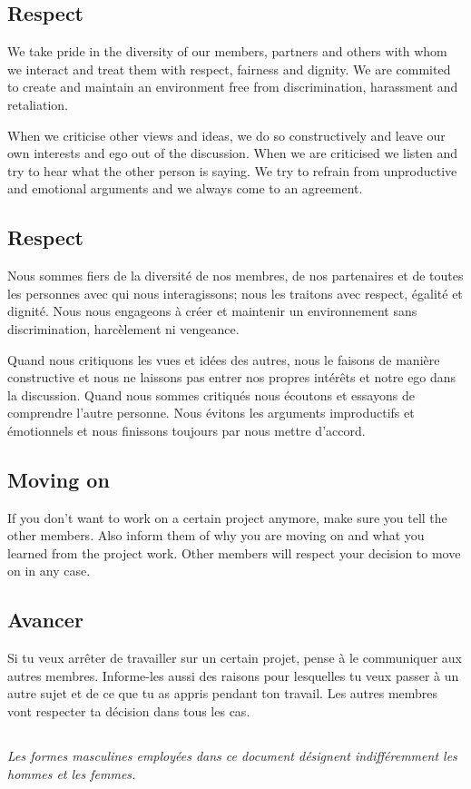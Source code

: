\english
	\subsection{Respect}
 	We take pride in the diversity of our members, partners and others with whom we interact and treat them with respect, fairness and dignity. We are commited to create and maintain an environment free from discrimination, harassment and retaliation. 

 	When we criticise other views and ideas, we do so constructively and leave our own interests and ego out of the discussion. 
 	When we are criticised we listen and try to hear what the other person is saying. 
 	We try to refrain from unproductive and emotional arguments and we always come to an agreement.
	\vspace{1cm}


\french
	\subsection{Respect}
	Nous sommes fiers de la diversité de nos membres, de nos partenaires et de toutes les personnes avec qui nous interagissons; nous les traitons avec respect, égalité et dignité. Nous nous engageons à créer et maintenir un environnement sans discrimination, harcèlement ni vengeance. 

	Quand nous critiquons les vues et idées des autres, nous le faisons de manière constructive et nous ne laissons pas entrer nos propres intérêts et notre ego dans la discussion.
	Quand nous sommes critiqués nous écoutons et essayons de comprendre l'autre personne. 
	Nous évitons les arguments improductifs et émotionnels et nous finissons toujours par nous mettre d'accord.

\english
	\subsection{Moving on}
	If you don't want to work on a certain project anymore, make sure you tell the other members. Also inform them of why you are moving on and what you learned from the project work. Other members will respect your decision to move on in any case.

\french
	\subsection{Avancer}
	Si tu veux arrêter de travailler sur un certain projet, pense à le communiquer aux autres membres. Informe-les aussi des raisons pour lesquelles tu veux passer à un autre sujet et de ce que tu as appris pendant ton travail. Les autres membres vont respecter ta décision dans tous les cas.

	\subsection*{}
	\textit{Les formes masculines employées dans ce document désignent indifféremment les hommes et les femmes.}


